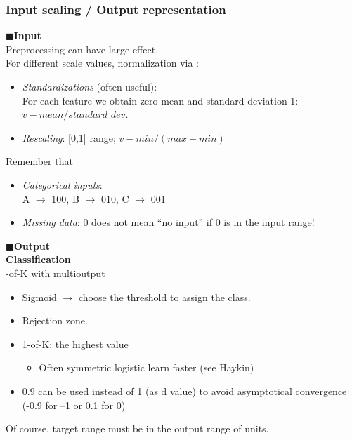 \documentclass[../main.tex]{subfiles}
\begin{document}
\subsubsection{Input scaling / Output representation}
$\blacksquare$\textbf{Input}\\
\noindent Preprocessing can have large effect.\\
For different scale values, normalization via :
\begin{itemize}
    \item \emph{Standardizations} (often useful):\\
    For each feature we obtain zero mean and standard deviation 1: $v-mean /standard\,\, dev$.
    \item \emph{Rescaling}: [0,1] range; $v-min /(max-min)$
\end{itemize}
Remember that
\begin{itemize}
    \item \emph{Categorical inputs}:\\
    A $\rightarrow$ 100, B $\rightarrow$ 010, C $\rightarrow$ 001
    \item \emph{Missing data}: 0 does not mean “no input” if 0 is in the input range!
\end{itemize} 
$\blacksquare$\textbf{Output}\\
\noindent\textbf{Classification}\\
-of-K with multioutput
\begin{itemize}
    \item Sigmoid $\rightarrow$ choose the threshold to assign the class.
    \item Rejection zone.
    \item 1-of-K: the highest value
    \begin{itemize}
        \item Often symmetric logistic learn faster (see Haykin)
    \end{itemize}
    \item 0.9 can be used instead of 1 (as d value) to avoid asymptotical convergence (-0.9 for –1 or 0.1 for 0)
\end{itemize}
Of course, target range must be in the output range of units.\\
\end{document}

